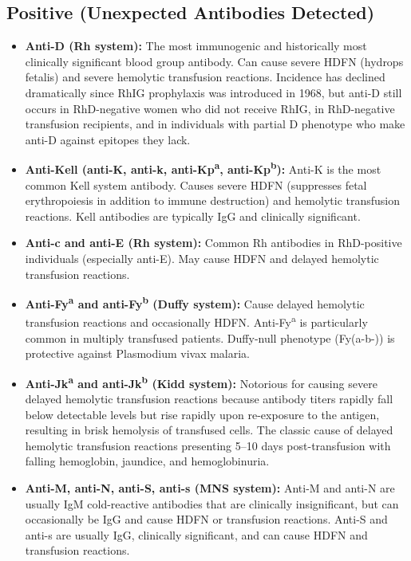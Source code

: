 \subsection*{Positive (Unexpected Antibodies Detected)}
\begin{itemize}
  \item \textbf{Anti-D (Rh system):} The most immunogenic and historically most clinically significant blood group antibody. Can cause severe HDFN (hydrops fetalis) and severe hemolytic transfusion reactions. Incidence has declined dramatically since RhIG prophylaxis was introduced in 1968, but anti-D still occurs in RhD-negative women who did not receive RhIG, in RhD-negative transfusion recipients, and in individuals with partial D phenotype who make anti-D against epitopes they lack.
  \item \textbf{Anti-Kell (anti-K, anti-k, anti-Kp\textsuperscript{a}, anti-Kp\textsuperscript{b}):} Anti-K is the most common Kell system antibody. Causes severe HDFN (suppresses fetal erythropoiesis in addition to immune destruction) and hemolytic transfusion reactions. Kell antibodies are typically IgG and clinically significant.
  \item \textbf{Anti-c and anti-E (Rh system):} Common Rh antibodies in RhD-positive individuals (especially anti-E). May cause HDFN and delayed hemolytic transfusion reactions.
  \item \textbf{Anti-Fy\textsuperscript{a} and anti-Fy\textsuperscript{b} (Duffy system):} Cause delayed hemolytic transfusion reactions and occasionally HDFN. Anti-Fy\textsuperscript{a} is particularly common in multiply transfused patients. Duffy-null phenotype (Fy(a-b-)) is protective against Plasmodium vivax malaria.
  \item \textbf{Anti-Jk\textsuperscript{a} and anti-Jk\textsuperscript{b} (Kidd system):} Notorious for causing severe delayed hemolytic transfusion reactions because antibody titers rapidly fall below detectable levels but rise rapidly upon re-exposure to the antigen, resulting in brisk hemolysis of transfused cells. The classic cause of delayed hemolytic transfusion reactions presenting 5--10 days post-transfusion with falling hemoglobin, jaundice, and hemoglobinuria.
  \item \textbf{Anti-M, anti-N, anti-S, anti-s (MNS system):} Anti-M and anti-N are usually IgM cold-reactive antibodies that are clinically insignificant, but can occasionally be IgG and cause HDFN or transfusion reactions. Anti-S and anti-s are usually IgG, clinically significant, and can cause HDFN and transfusion reactions.

\end{itemize}
